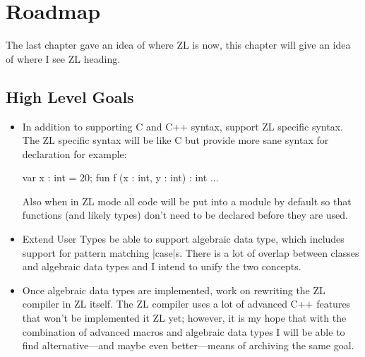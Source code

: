 \chapter{Roadmap}
\label{roadmap}

The last chapter gave an idea of where ZL is now, this chapter will
give an idea of where I see ZL heading.

\section*{High Level Goals}

\begin{itemize}

\item

In addition to supporting C and C++ syntax, support ZL specific
syntax.  The ZL specific syntax will be like C but provide more sane
syntax for declaration for example:
\begin{code}
var x : int = 20;
fun f (x : int, y : int) : int {...}
\end{code}
Also when in ZL mode all code will be put into a module by default so
that functions (and likely types) don't need to be declared before
they are used.

\item

Extend User Types be able to support algebraic data type, which
includes support for pattern matching |case|s.  There is a lot of
overlap between classes and algebraic data types and I intend to
unify the two concepts.

\item

Once algebraic data types are implemented, work on rewriting the ZL
compiler in ZL itself.  The ZL compiler uses a lot of advanced C++
features that won't be implemented it ZL yet; however, it is my hope
that with the combination of advanced macros and algebraic data types
I will be able to find alternative---and maybe even better---means of
archiving the same goal.

\end{itemize}

